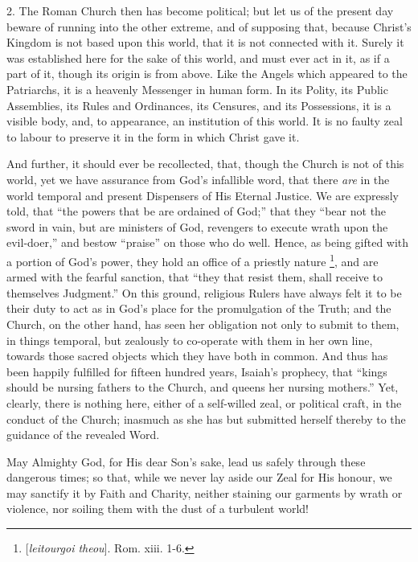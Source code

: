 2. The Roman Church then has become political; but let us of the
present day beware of running into the other extreme, and of supposing
that, because Christ's Kingdom is not based upon this world, that it is
not connected with it. Surely it was established here for the sake of
this world, and must ever act in it, as if a part of it, though its
origin is from above. Like the Angels which appeared to the Patriarchs,
it is a heavenly Messenger in human form. In its Polity, its Public
Assemblies, its Rules and Ordinances, its Censures, and its Possessions,
it is a visible body, and, to appearance, an institution of this world.
It is no faulty zeal to labour to preserve it in the form in which
Christ gave it.

And further, it should ever be recollected, that, though the Church
is not of this world, yet we have assurance from God's infallible word,
that there \emph{are} in the world temporal and present Dispensers of His
Eternal Justice. We are expressly told, that ``the powers that be
are ordained of God;'' that they ``bear not the sword in vain,
but are ministers of God, revengers to execute wrath upon the
evil-doer,'' and bestow ``praise'' on those who do well.
Hence, as being gifted with a portion of God's power, they hold an
office of a priestly nature \footnote{[\emph{leitourgoi
theou}]. Rom. xiii. 1-6.},
and are armed with the fearful sanction, that ``they that resist
them, shall receive to themselves Judgment.'' On this ground,
religious Rulers have always felt it to be their duty to act as in God's
place for the promulgation of the Truth; and the Church, on the other
hand, has seen her obligation not only to submit to them, in things
temporal, but zealously to co-operate with them in her own line, towards
those sacred objects which they have both in common. And thus has been
happily fulfilled for fifteen hundred years, Isaiah's prophecy, that
``kings should be nursing fathers to the Church, and queens her
nursing mothers.'' Yet, clearly, there is nothing here, either of a
self-willed zeal, or political craft, in the conduct of the Church;
inasmuch as she has but submitted herself thereby to the guidance of the
revealed Word.

May Almighty God, for His dear Son's sake, lead us safely through
these dangerous times; so that, while we never lay aside our Zeal for
His honour, we may sanctify it by Faith and Charity, neither staining
our garments by wrath or violence, nor soiling them with the dust of a
turbulent world!


